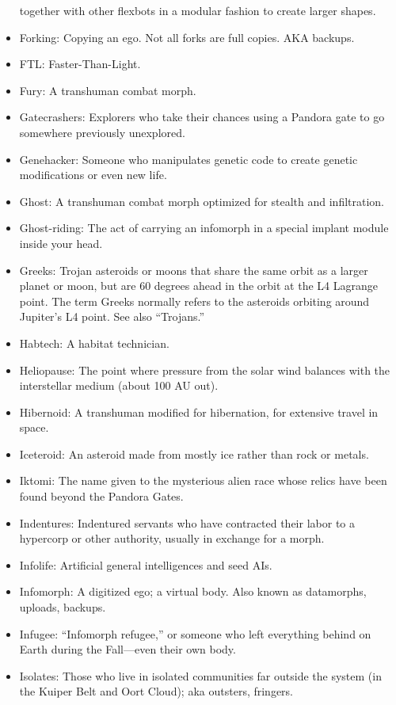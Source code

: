 \begin{itemize}
  together with other flexbots in a modular fashion to create larger
  shapes.
\item Forking: Copying an ego. Not all forks are full copies.  AKA
  backups.
\item FTL: Faster-Than-Light.
\item Fury: A transhuman combat morph.
\item Gatecrashers: Explorers who take their chances using a Pandora
  gate to go somewhere previously unexplored.
\item Genehacker: Someone who manipulates genetic code to create
  genetic modifications or even new life.
\item Ghost: A transhuman combat morph optimized for stealth and
  infiltration.
\item Ghost-riding: The act of carrying an infomorph in a special
  implant module inside your head.
\item Greeks: Trojan asteroids or moons that share the same orbit as a
  larger planet or moon, but are 60 degrees ahead in the orbit at the
  L4 Lagrange point. The term Greeks normally refers to the asteroids
  orbiting around Jupiter's L4 point. See also ``Trojans.''
\item Habtech: A habitat technician.
\item Heliopause: The point where pressure from the solar wind
  balances with the interstellar medium (about 100 AU out).
\item Hibernoid: A transhuman modified for hibernation, for extensive
  travel in space.
\item Iceteroid: An asteroid made from mostly ice rather than rock or
  metals.
\item Iktomi: The name given to the mysterious alien race whose relics
  have been found beyond the Pandora Gates.
\item Indentures: Indentured servants who have contracted their labor
  to a hypercorp or other authority, usually in exchange for a morph.
\item Infolife: Artificial general intelligences and seed AIs.
\item Infomorph: A digitized ego; a virtual body. Also known as
  datamorphs, uploads, backups.
\item Infugee: ``Infomorph refugee,'' or someone who left everything
  behind on Earth during the Fall—even their own body.
\item Isolates: Those who live in isolated communities far outside the
  system (in the Kuiper Belt and Oort Cloud); aka outsters, fringers.

\end{itemize}
